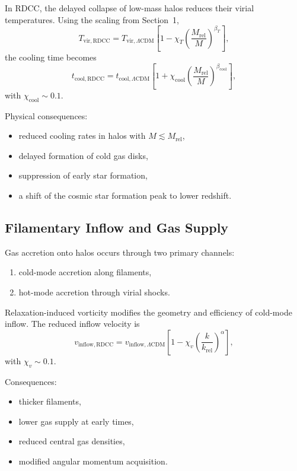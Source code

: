 \documentclass[11pt,a4paper]{article}
\begin{document}
In RDCC, the delayed collapse of low-mass halos reduces their virial temperatures. Using the
scaling from Section~1,
\begin{equation}
T_{\mathrm{vir,RDCC}}
=
T_{\mathrm{vir},\Lambda\mathrm{CDM}}
\left[
1
-
\chi_{T}
\left(
\frac{M_{\mathrm{rel}}}{M}
\right)^{\beta_{T}}
\right],
\end{equation}
the cooling time becomes
\begin{equation}
t_{\mathrm{cool,RDCC}}
=
t_{\mathrm{cool},\Lambda\mathrm{CDM}}
\left[
1
+
\chi_{\mathrm{cool}}
\left(
\frac{M_{\mathrm{rel}}}{M}
\right)^{\beta_{\mathrm{cool}}}
\right],
\end{equation}
with $\chi_{\mathrm{cool}} \sim 0.1$.

Physical consequences:
\begin{itemize}
\item reduced cooling rates in halos with $M \lesssim M_{\mathrm{rel}}$,
\item delayed formation of cold gas disks,
\item suppression of early star formation,
\item a shift of the cosmic star formation peak to lower redshift.
\end{itemize}

\subsection{Filamentary Inflow and Gas Supply}

Gas accretion onto halos occurs through two primary channels:
\begin{enumerate}
\item cold-mode accretion along filaments,
\item hot-mode accretion through virial shocks.
\end{enumerate}

Relaxation-induced vorticity modifies the geometry and efficiency of cold-mode inflow. The
reduced inflow velocity is
\begin{equation}
v_{\mathrm{inflow,RDCC}}
=
v_{\mathrm{inflow},\Lambda\mathrm{CDM}}
\left[
1
-
\chi_{v}
\left(
\frac{k}{k_{\mathrm{rel}}}
\right)^{\alpha}
\right],
\end{equation}
with $\chi_{v} \sim 0.1$.

Consequences:
\begin{itemize}
\item thicker filaments,
\item lower gas supply at early times,
\item reduced central gas densities,
\item modified angular momentum acquisition.
\end{itemize}
\end{document}
